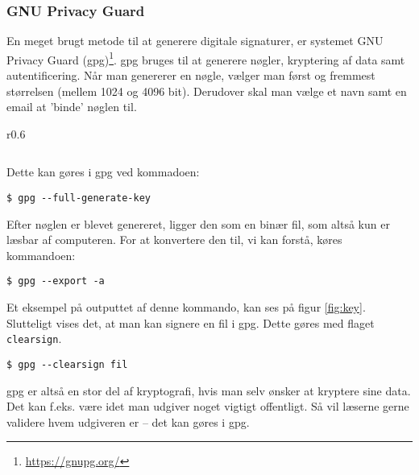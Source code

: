     \subsubsection{GNU Privacy Guard}
    En meget brugt metode til at generere digitale signaturer, er systemet GNU Privacy Guard (gpg)\footnote{\url{https://gnupg.org/}}.
    gpg bruges til at generere nøgler, kryptering af data samt autentificering.
    Når man genererer en nøgle, vælger man først og fremmest størrelsen (mellem 1024 og 4096 bit).
    Derudover skal man vælge et navn samt en email at 'binde' nøglen til.\\

    \begin{wrapfigure}{r}{0.6\textwidth}
        \vspace{-30pt}
        \begin{center}
            \inputminted[python3, breaklines, fontsize=\scriptsize]{bash}{src/public.key}
            \vspace{-20pt}
            \caption{1024-bit nøgle genereret i gpg}
            \label{fig:key}
        \end{center}
        \vspace{-100pt}
    \end{wrapfigure}



    Dette kan gøres i gpg ved kommadoen:
    \begin{verbatim}
$ gpg --full-generate-key
    \end{verbatim}


Efter nøglen er blevet genereret, ligger den som en binær fil, som altså kun er læsbar af computeren.
For at konvertere den til, vi kan forstå, køres kommandoen:
  \begin{verbatim}
$ gpg --export -a
  \end{verbatim}

Et eksempel på outputtet af denne kommando, kan ses på figur \ref{fig:key}.\\


Slutteligt vises det, at man kan signere en fil i gpg.
Dette gøres med flaget \texttt{clearsign}.
    \begin{verbatim}
$ gpg --clearsign fil
    \end{verbatim}

gpg er altså en stor del af kryptografi, hvis man selv ønsker at kryptere sine data.
Det kan f.eks. være idet man udgiver noget vigtigt offentligt.
Så vil læserne gerne validere hvem udgiveren er -- det kan gøres i gpg.
